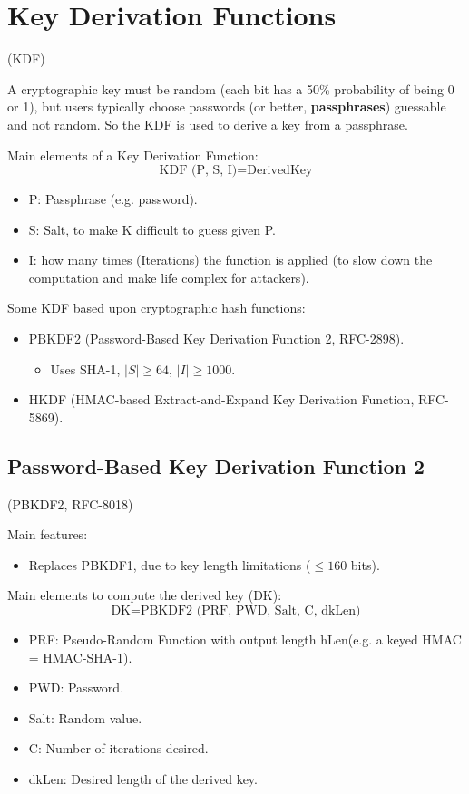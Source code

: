 \section{Key Derivation Functions}
\begin{center}
    (KDF)
\end{center}
A cryptographic key must be random (each bit has a 50\% probability of being 0 or 1), but users typically choose passwords (or better, \textbf{passphrases}) guessable and not random. So the KDF is used to derive a key from a passphrase.

Main elements of a Key Derivation Function:
\[
    \text{KDF (P, S, I)} = \text{DerivedKey}
\]

\begin{itemize}
    \item P: Passphrase (e.g. password).
    \item S: Salt, to make K difficult to guess given P.
    \item I: how many times (Iterations) the function is applied (to slow down the computation and make life complex for attackers).
\end{itemize}

\vspace{0.2cm}

Some KDF based upon cryptographic hash functions:
\begin{itemize}
    \item PBKDF2 (Password-Based Key Derivation Function 2, RFC-2898).
    \begin{itemize}
        \item Uses SHA-1, $|S| \ge 64$, $|I| \ge 1000$.
    \end{itemize}
    \item HKDF (HMAC-based Extract-and-Expand Key Derivation Function, RFC-5869).
\end{itemize}

\subsection{Password-Based Key Derivation Function 2}
\begin{center}
    (PBKDF2, RFC-8018)
\end{center}

Main features:
\begin{itemize}
    \item Replaces PBKDF1, due to key length limitations ($\le 160$ bits).
\end{itemize}
Main elements to compute the derived key (DK):
\[
    \text{DK} = \text{PBKDF2 (PRF, PWD, Salt, C, dkLen)}
\]
\begin{itemize}
    \item PRF: Pseudo-Random Function with output length hLen(e.g. a keyed HMAC = HMAC-SHA-1).
    \item PWD: Password.
    \item Salt: Random value.
    \item C: Number of iterations desired.
    \item dkLen: Desired length of the derived key.
\end{itemize}

